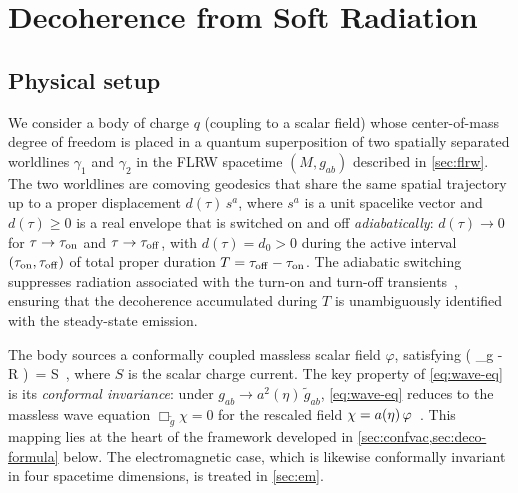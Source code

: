 
\section{Decoherence from Soft Radiation}
\label{sec:decoherence}

\subsection{Physical setup}
\label{sec:setup}

We consider a body of charge $q$ (coupling to a scalar field) whose center-of-mass
degree of freedom is placed in a quantum superposition of two spatially separated
worldlines $\gamma_1$ and $\gamma_2$ in the FLRW spacetime $(M, g_{ab})$ described
in \cref{sec:flrw}.  The two worldlines are comoving geodesics that share the same
spatial trajectory up to a proper displacement $d(\tau)\, s^a$, where $s^a$ is a
unit spacelike vector and $d(\tau) \geq 0$ is a real envelope that is switched on
and off \emph{adiabatically}: $d(\tau) \to 0$ for $\tau \to \tau_{\rm on}$ and
$\tau \to \tau_{\rm off}$, with $d(\tau) = d_0 > 0$ during the active interval
$(\tau_{\rm on}, \tau_{\rm off})$ of total proper duration $T =
\tau_{\rm off} - \tau_{\rm on}$.  The adiabatic switching suppresses radiation
associated with the turn-on and turn-off transients~\cite{DSW2022,DSW2025a},
ensuring that the decoherence accumulated during $T$ is unambiguously identified
with the steady-state emission.

The body sources a conformally coupled massless scalar field $\varphi$, satisfying
\be
  \lb( \Box_g -  R \rb)\, \varphi = S \,,
  \label{eq:wave-eq}
\ee
where $S$ is the scalar charge current.  The key property of \cref{eq:wave-eq} is its
\emph{conformal invariance}: under $g_{ab} \to a^2(\eta)\,\tilde{g}_{ab}$,
\cref{eq:wave-eq} reduces to the massless wave equation $\Box_{\tilde{g}}\chi = 0$
for the rescaled field $\chi = a(\eta)\,\varphi$~\cite{Wald84}.  This mapping
lies at the heart of the framework developed in
\cref{sec:confvac,sec:deco-formula} below.  The electromagnetic case, which is
likewise conformally invariant in four spacetime dimensions, is treated in
\cref{sec:em}.


